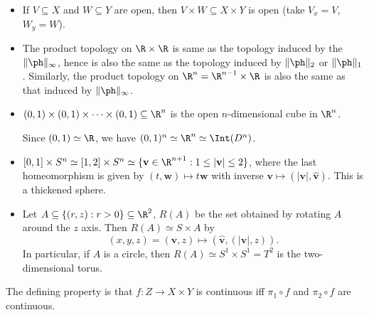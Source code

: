 \documentclass[a4paper]{article}
\begin{document}
\begin{eg}\leavevmode
  \begin{itemize}
    \item If $V\subseteq X$ and $W\subseteq Y$ are open, then $V\times W \subseteq X\times Y$ is open (take $V_x = V$, $W_y = W$).
    \item The product topology on $\R\times \R$ is same as the topology induced by the $\|\ph \|_\infty$, hence is also the same as the topology induced by $\|\ph\|_2$ or $\|\ph\|_1$. Similarly, the product topology on $\R^n = \R^{n - 1}\times \R$ is also the same as that induced by $\|\ph\|_\infty$.
    \item $(0, 1) \times (0, 1)\times \cdots\times (0, 1) \subseteq \R^n$ is the open $n$-dimensional cube in $\R^n$.

      Since $(0, 1)\simeq \R$, we have $(0, 1)^n \simeq \R^n \simeq \Int(D^n)$.
    \item $[0, 1]\times S^n \simeq [1, 2] \times S^n\simeq \{\mathbf{v}\in \R^{n + 1}: 1 \leq |\mathbf{v}| \leq 2\}$, where the last homeomorphism is given by $(t, \mathbf{w}) \mapsto t\mathbf{w}$ with inverse $\mathbf{v} \mapsto (|\mathbf{v}|, \hat{\mathbf{v}})$. This is a thickened sphere.

    \item Let $A\subseteq \{(r, z): r > 0\} \subseteq \R^2$, $R(A)$ be the set obtained by rotating $A$ around the $z$ axis. Then $R(A) \simeq S\times A$ by
      \[
        (x, y, z) = (\mathbf{v}, z) \mapsto (\hat{\mathbf{v}}, (|\mathbf{v}|, z)).
      \]
    In particular, if $A$ is a circle, then $R(A) \simeq S^1\times S^1 = T^2$ is the two-dimensional torus.
      \begin{center}
      \end{center}
  \end{itemize}
\end{eg}
The defining property is that $f: Z\to X\times Y$ is continuous iff $\pi_1\circ f$ and $\pi_2\circ f$ are continuous.
\end{document}
